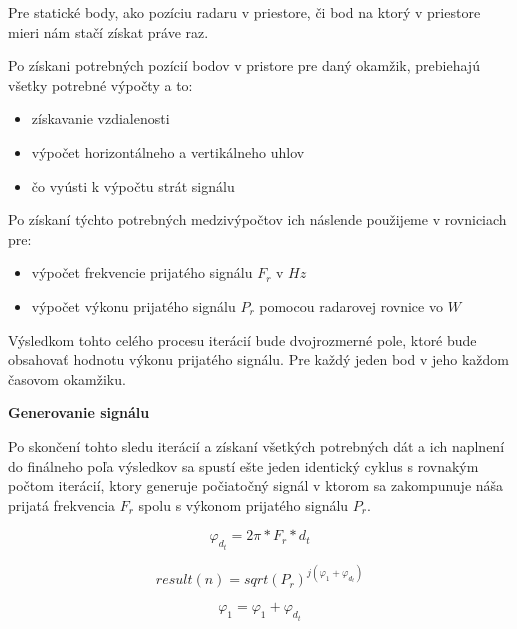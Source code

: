 \documentclass[slovak]{ExcelAtFIT} %
\begin{document}
    Pre statické body, ako pozíciu radaru v priestore, či bod na ktorý v priestore mieri nám stačí získat práve raz.
    \newline

    Po získani potrebných pozícií bodov v pristore pre daný okamžik, prebiehajú všetky potrebné výpočty a to:
    \begin{itemize} 
      \item získavanie vzdialenosti
      \item výpočet horizontálneho a vertikálneho uhlov
      \item čo vyústi k výpočtu strát signálu
    \end{itemize}

    Po získaní týchto potrebných medzivýpočtov ich náslende použijeme v rovniciach pre:

    \begin{itemize}
      \item výpočet frekvencie prijatého signálu $F_{r}$ v $Hz$
      \item výpočet výkonu prijatého signálu $P_{r}$ pomocou radarovej rovnice vo $W$
    \end{itemize}

    Výsledkom tohto celého procesu iterácií bude dvojrozmerné pole, ktoré bude obsahovať hodnotu výkonu prijatého signálu. Pre každý jeden bod v jeho každom časovom okamžiku.\newline

    \textbf{Generovanie signálu}

    Po skončení tohto sledu iterácií a získaní všetkých potrebných dát a ich naplnení do finálneho poľa výsledkov sa spustí ešte jeden identický cyklus s rovnakým počtom iterácií, ktory generuje počiatočný signál v ktorom sa zakompunuje náša prijatá frekvencia $F_{r}$ spolu s výkonom prijatého signálu $P_{r}$.\newline  

    \begin{equation} \label{eq:631}
      \varphi_{d_{t}} = 2\pi * F_{r} * d_{t}
    \end{equation}

    \begin{equation} \label{eq:632}
      result(n) = sqrt(P_{r})^{j(\varphi_{1} + \varphi_{d_{t}})}
    \end{equation}

    \begin{equation} \label{eq:633}
    \varphi_{1} = \varphi_{1} +  \varphi_{d_{t}}
    \end{equation}    
\end{document}
